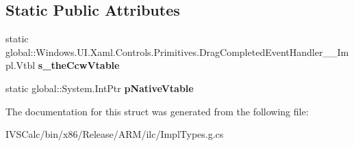 \subsection*{Static Public Attributes}
\begin{DoxyCompactItemize}
\item 
\mbox{\label{struct_windows_1_1_u_i_1_1_xaml_1_1_controls_1_1_primitives_1_1_drag_completed_event_handler_____impl_1_1_vtbl_ace0f627923b52670fe860af5375fe7a6}} 
static global\+::\+Windows.\+U\+I.\+Xaml.\+Controls.\+Primitives.\+Drag\+Completed\+Event\+Handler\+\_\+\+\_\+\+Impl.\+Vtbl {\bfseries s\+\_\+the\+Ccw\+Vtable}
\item 
\mbox{\label{struct_windows_1_1_u_i_1_1_xaml_1_1_controls_1_1_primitives_1_1_drag_completed_event_handler_____impl_1_1_vtbl_aa692054afd4da86b4c27d861eebf290c}} 
static global\+::\+System.\+Int\+Ptr {\bfseries p\+Native\+Vtable}
\end{DoxyCompactItemize}


The documentation for this struct was generated from the following file\+:\begin{DoxyCompactItemize}
\item 
I\+V\+S\+Calc/bin/x86/\+Release/\+A\+R\+M/ilc/Impl\+Types.\+g.\+cs\end{DoxyCompactItemize}
